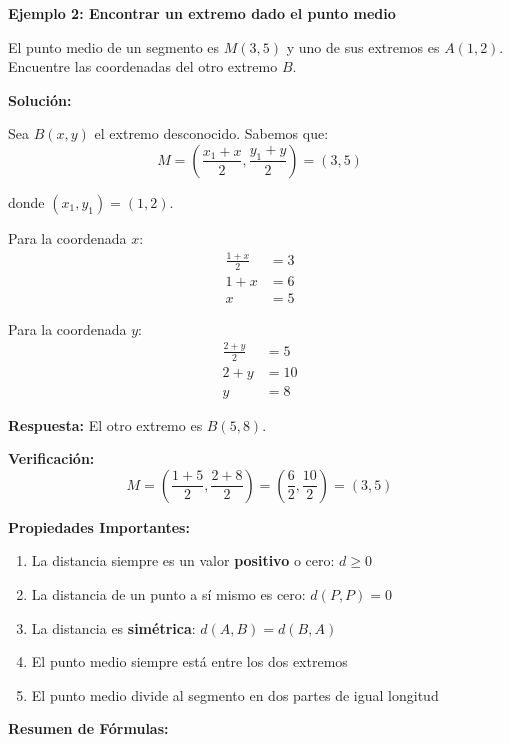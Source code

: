 \newpage

\begin{example}
\textbf{Ejemplo 2: Encontrar un extremo dado el punto medio}

El punto medio de un segmento es $M(3, 5)$ y uno de sus extremos es $A(1, 2)$. Encuentre las coordenadas del otro extremo $B$.

\textbf{Solución:}

Sea $B(x, y)$ el extremo desconocido. Sabemos que:
$$M = \left(\frac{x_1 + x}{2}, \frac{y_1 + y}{2}\right) = (3, 5)$$

donde $(x_1, y_1) = (1, 2)$.

Para la coordenada $x$:
\begin{align*}
\frac{1 + x}{2} &= 3 \\
1 + x &= 6 \\
x &= 5
\end{align*}

Para la coordenada $y$:
\begin{align*}
\frac{2 + y}{2} &= 5 \\
2 + y &= 10 \\
y &= 8
\end{align*}

\textbf{Respuesta:} El otro extremo es $B(5, 8)$.

\textbf{Verificación:}
$$M = \left(\frac{1 + 5}{2}, \frac{2 + 8}{2}\right) = \left(\frac{6}{2}, \frac{10}{2}\right) = (3, 5)$$ \checkmark
\end{example}

\begin{theorem}
\textbf{Propiedades Importantes:}

\begin{enumerate}
    \item La distancia siempre es un valor \textbf{positivo} o cero: $d \geq 0$
    \item La distancia de un punto a sí mismo es cero: $d(P, P) = 0$
    \item La distancia es \textbf{simétrica}: $d(A, B) = d(B, A)$
    \item El punto medio siempre está entre los dos extremos
    \item El punto medio divide al segmento en dos partes de igual longitud
\end{enumerate}
\end{theorem}

\textbf{Resumen de Fórmulas:}


